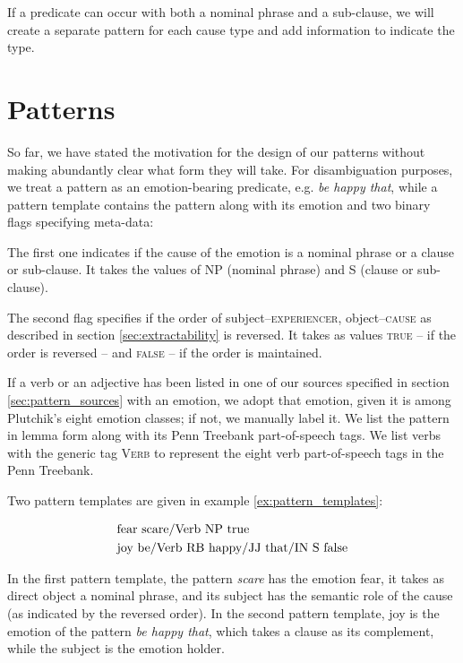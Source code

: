 If a predicate can occur with both a nominal phrase and a sub-clause, we will create a separate pattern for each cause type and add information to indicate the type.

\section{Patterns} \label{sec:patterns}

So far, we have stated the motivation for the design of our patterns without making abundantly clear what form they will take. For disambiguation purposes, we treat a pattern as an emotion-bearing predicate, e.g. \textit{be happy that}, while a pattern template contains the pattern along with its emotion and two binary flags specifying meta-data:
\begin{aenumerate}[noitemsep]
	\item The first one indicates if the cause of the emotion is a nominal phrase or a clause or sub-clause. It takes the values of \textsc{NP} (nominal phrase) and \textsc{S} (clause or sub-clause).
	\item The second flag specifies if the order of subject--\textsc{experiencer}, object--\textsc{cause} as described in section \ref{sec:extractability} is reversed. It takes as values \textsc{true} -- if the order is reversed -- and \textsc{false} -- if the order is maintained.
\end{aenumerate}

If a verb or an adjective has been listed in one of our sources specified in section \ref{sec:pattern_sources} with an emotion, we adopt that emotion, given it is among Plutchik's eight emotion classes; if not, we manually label it. We list the pattern in lemma form along with its Penn Treebank part-of-speech tags. We list verbs with the generic tag \textsc{Verb} to represent the eight verb part-of-speech tags in the Penn Treebank.

Two pattern templates are given in example \ref{ex:pattern_templates}:

\begin{align}
\begin{split}\label{ex:pattern_templates}
&\textnormal{fear	scare/Verb	NP	true}\\
&\textnormal{joy	be/Verb RB happy/JJ that/IN	S	false}
\end{split}
\end{align}

In the first pattern template, the pattern \textit{scare} has the emotion fear, it takes as direct object a nominal phrase, and its subject has the semantic role of the cause (as indicated by the reversed order). In the second pattern template, joy is the emotion of the pattern \textit{be happy that}, which takes a clause as its complement, while the subject is the emotion holder.

